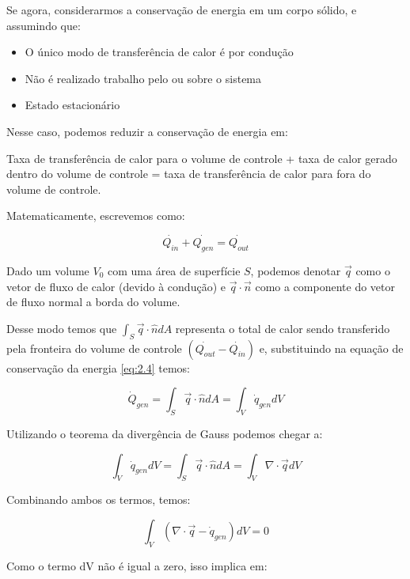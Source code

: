 Se agora, considerarmos a conservação de energia em um corpo sólido, e assumindo que:
\begin{itemize}
    \item O único modo de transferência de calor é por condução
    \item Não é realizado trabalho pelo ou sobre o sistema
    \item Estado estacionário
\end{itemize}

Nesse caso, podemos reduzir a conservação de energia em:

Taxa de transferência de calor para o volume de controle + taxa de calor gerado dentro do volume de controle = taxa de transferência de calor para fora do volume de controle.

Matematicamente, escrevemos como:

\begin{equation}
    \dot{Q_{in}} + \dot{Q_{gen}} = \dot{Q_{out}}
    \label{eq:2.4}
\end{equation}

Dado um volume $V_0$ com uma área de superfície $S$, podemos denotar $\vec{q}$ como o vetor de fluxo de calor (devido à condução) e $\vec{q} \cdot \vec{n}$ como a componente do vetor de fluxo normal a borda do volume.

Desse modo temos que $\int_S \vec{q}\cdot\hat{n}dA$ representa o total de calor sendo transferido pela fronteira do volume de controle $(\dot{Q_{out}} - \dot{Q_{in}})$ e, substituindo na equação de conservação da energia \ref{eq:2.4} temos:

\begin{equation}
    \dot{Q}_{gen} = \int_S \vec{q}\cdot\hat{n}dA = \int_V \dot{q}_{gen}dV
\end{equation}

Utilizando o teorema da divergência de Gauss podemos chegar a:

\begin{equation}
    \int_V \dot{q}_{gen}dV = \int_S \vec{q}\cdot\hat{n}dA = \int_V \nabla\cdot\vec{q}dV
\end{equation}

Combinando ambos os termos, temos:

\begin{equation}
    \int_V (\nabla \cdot \vec{q} - \dot{q}_{gen})dV = 0
\end{equation}

Como o termo dV não é igual a zero, isso implica em:

